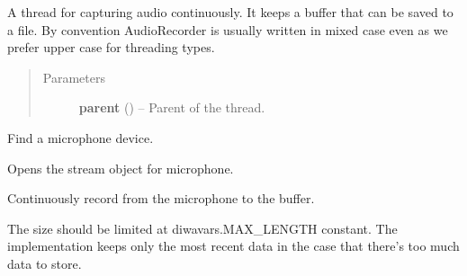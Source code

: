 \documentclass[letterpaper,10pt,english]{sphinxmanual}
\begin{document}
\begin{fulllineitems}
\label{threads:threads.audiorecorder.AudioRecorder}
A thread for capturing audio continuously.
It keeps a buffer that can be saved to a file.
By convention AudioRecorder is usually written in mixed case
even as we prefer upper case for threading types.
\begin{quote}\begin{description}
\item[{Parameters}] \leavevmode
\textbf{parent} ({\hyperref[diwacs:diwacs.GraphicalUserInterface]{}}) -- Parent of the thread.

\end{description}\end{quote}

\begin{fulllineitems}
\label{threads:threads.audiorecorder.AudioRecorder.find_input_device}
Find a microphone device.

\end{fulllineitems}


\begin{fulllineitems}
\label{threads:threads.audiorecorder.AudioRecorder.open_mic_stream}
Opens the stream object for microphone.

\end{fulllineitems}


\begin{fulllineitems}
\label{threads:threads.audiorecorder.AudioRecorder.run}
Continuously record from the microphone to the buffer.

The size should be limited at diwavars.MAX\_LENGTH constant.
The implementation keeps only the most recent data in the
case that there's too much data to store.

\end{fulllineitems}



\end{fulllineitems}
\end{document}
